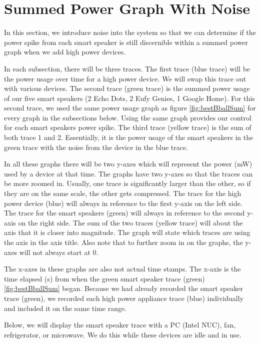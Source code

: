 \section{Summed Power Graph With Noise}
\label{sumPowerGraphSection}
In this section, we introduce noise into the system so that we can determine if the power spike from each smart speaker is still discernible within a summed power graph when we add high power devices.

In each subsection, there will be three traces. The first trace (blue trace) will be the power usage over time for a high power device. We will swap this trace out with various devices. The second trace (green trace) is the summed power usage of our five smart speakers (2 Echo Dots, 2 Eufy Genies, 1 Google Home). For this second trace, we used the same power usage graph as figure \ref{fig:bestBballSum} for every graph in the subsections below. Using the same graph provides our control for each smart speakers power spike. The third trace (yellow trace) is the sum of both trace 1 and 2. Essentially, it is the power usage of the smart speakers in the green trace with the noise from the device in the blue trace.

In all these graphs there will be two y-axes which will represent the power (mW) used by a device at that time. The graphs have two y-axes so that the traces can be more zoomed in. Usually, one trace is significantly larger than the other, so if they are on the same scale, the other gets compressed. The trace for the high power device (blue) will always in reference to the first y-axis on the left side. The trace for the smart speakers (green) will always in reference to the second y-axis on the right side. The sum of the two traces (yellow trace) will about the axis that it is closer into magnitude. The graph will state which traces are using the axis in the axis title. Also note that to further zoom in on the graphs, the y-axes will not always start at 0.

The x-axes in these graphs are also not actual time stamps. The x-axis is the time elapsed (s) from when the green smart speaker trace (green) \ref{fig:bestBballSum} began. Because we had already recorded the smart speaker trace (green), we recorded each high power appliance trace (blue) individually and included it on the same time range.

Below, we will display the smart speaker trace with a PC (Intel NUC), fan, refrigerator, or microwave. We do this while these devices are idle and in use.

